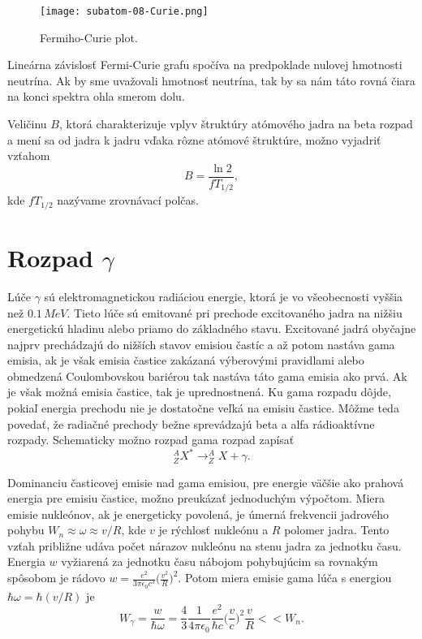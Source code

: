 \documentclass[../../main.tex]{subfiles}
\begin{document}
\begin{figure}[!h]
\texttt{[image: subatom-08-Curie.png]}
\centering
\caption{Fermiho-Curie plot.}
\label{sf8:fig:Curie}
\end{figure}

Lineárna závislosť Fermi-Curie grafu spočíva na predpoklade nulovej hmotnosti neutrína. Ak by sme uvažovali hmotnosť neutrína, tak by sa nám táto rovná čiara na konci spektra ohla smerom dolu.

Veličinu $B$, ktorá charakterizuje vplyv štruktúry atómového jadra na beta rozpad a mení sa od jadra k jadru vďaka rôzne atómové štruktúre, možno vyjadriť vzťahom
$$ B= \frac{\ln2}{fT_{1/2}},$$
kde $fT_{1/2}$ nazývame zrovnávací polčas.

\section{Rozpad $\gamma$}
Lúče $\gamma$ sú elektromagnetickou radiáciou energie, ktorá je vo všeobecnosti vyššia než $0.1\,\unit{MeV}$. Tieto lúče sú emitované pri prechode excitovaného jadra na nižšiu energetickú hladinu alebo priamo do základného stavu. Excitované jadrá obyčajne najprv prechádzajú do nižších stavov emisiou častíc a až potom nastáva gama emisia, ak je však emisia častice zakázaná výberovými pravidlami alebo obmedzená Coulombovskou bariérou tak nastáva táto gama emisia ako prvá. Ak je však možná emisia častice, tak je uprednostnená. Ku gama rozpadu dôjde, pokiaľ energia prechodu nie je dostatočne veľká na emisiu častice. Môžme teda povedať, že radiačné prechody bežne sprevádzajú beta a alfa rádioaktívne rozpady. Schematicky možno rozpad gama rozpad zapísať
$$ ^A_ZX^{*} \rightarrow ^A_ZX + \gamma.$$

Dominanciu časticovej emisie nad gama emisiou, pre energie väčšie ako prahová energia pre emisiu častice, možno preukázať jednoduchým výpočtom. Miera emisie nukleónov, ak je energeticky povolená, je úmerná frekvencii jadrového pohybu $W_n \approx \omega \approx v/R$, kde $v$ je rýchlosť nukleónu a $R$ polomer jadra. Tento vzťah približne udáva počet nárazov nukleónu na stenu jadra za jednotku času. Energia $w$ vyžiarená za jednotku času nábojom pohybujúcim sa rovnakým spôsobom je rádovo $w = \frac{e^2}{3\pi\epsilon_0c^3}\big(\frac{v^2}{R}\big)^2.$ Potom miera emisie gama lúča s energiou $\hbar \omega = \hbar(v/R)$ je 
$$ W_{\gamma} = \frac{w}{\hbar \omega} = \frac{4}{3}\frac{1}{4\pi \epsilon_0} \frac{e^2}{\hbar c} \bigg( \frac{v}{c} \bigg)^2 \frac{v}{R} << W_n. $$
\end{document}

